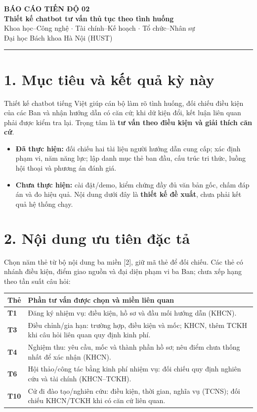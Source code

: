 \documentclass[12pt,a4paper]{article}
\begin{document}
\begin{center}
{\small\bfseries BÁO CÁO TIẾN ĐỘ 02}\\[3pt]
{\Large\bfseries Thiết kế chatbot tư vấn thủ tục theo tình huống}\\[3pt]
{\small Khoa học--Công nghệ \(\cdot\) Tài chính--Kế hoạch \(\cdot\) Tổ chức--Nhân sự}\\[1pt]
{\small Đại học Bách khoa Hà Nội (HUST)}
\end{center}
\vspace{-5pt}
\noindent\rule{\textwidth}{0.5pt}

\section*{1. Mục tiêu và kết quả kỳ này}
Thiết kế chatbot tiếng Việt giúp cán bộ làm rõ tình huống, đối chiếu điều kiện của các Ban và nhận hướng dẫn có căn cứ; khi dữ kiện đổi, kết luận liên quan phải được kiểm tra lại. Trọng tâm là \textbf{tư vấn theo điều kiện và giải thích căn cứ}.
\begin{itemize}
\item \textbf{Đã thực hiện:} đối chiếu hai tài liệu người hướng dẫn cung cấp; xác định phạm vi, năm năng lực; lập danh mục thẻ ban đầu, cấu trúc tri thức, luồng hội thoại và phương án đánh giá.
\item \textbf{Chưa thực hiện:} cài đặt/demo, kiểm chứng đầy đủ văn bản gốc, chấm đáp án và đo hiệu quả. Nội dung dưới đây là \textbf{thiết kế đề xuất}, chưa phải kết quả hệ thống chạy.
\end{itemize}

\section*{2. Nội dung ưu tiên đặc tả}
Chọn năm thẻ từ bộ nội dung ba miền [2], giữ mã thẻ để đối chiếu. Các thẻ có nhánh điều kiện, điểm giao nguồn và đại diện phạm vi ba Ban; chưa xếp hạng theo tần suất câu hỏi:

\begin{tabularx}{\textwidth}{@{}>{\bfseries}p{12mm}X@{}}
\toprule
\textbf{Thẻ} & \textbf{Phần tư vấn được chọn và miền liên quan}\\
\midrule
T1 & Đăng ký nhiệm vụ: điều kiện, hồ sơ và đầu mối hướng dẫn (KHCN).\\
T3 & Điều chỉnh/gia hạn: trường hợp, điều kiện và mốc; KHCN, thêm TCKH khi câu hỏi liên quan quy định kinh phí.\\
T4 & Nghiệm thu: yêu cầu, mốc và thành phần hồ sơ; nêu điểm chưa thống nhất để xác nhận (KHCN).\\
T6 & Hội thảo/công tác bằng kinh phí nhiệm vụ: đối chiếu quy định nghiên cứu và tài chính (KHCN--TCKH).\\
T10 & Cử đi đào tạo/nghiên cứu: điều kiện, thời gian, nghĩa vụ (TCNS); đối chiếu KHCN/TCKH khi có căn cứ liên quan.\\
\bottomrule
\end{tabularx}
\end{document}
